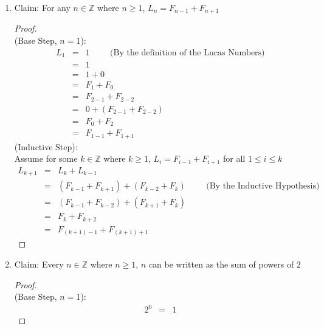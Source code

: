 \documentclass{article}
\begin{document}
\begin{enumerate}
\begin{proof}
\begin{eqnarray}
            &=& 3(a-b) \hspace{1cm} \text{($3(a-b)$ is divisible by $3$ because $3$ and $a-b \in \mathbb{Z}$, so $3(a-b) \in \mathbb{Z}$)}
        \end{eqnarray}
    \end{proof}
    \item Claim: For any $n \in \mathbb{Z}$ where $n \geq 1$, $L_n = F_{n-1} + F_{n+1}$
    \begin{proof}
        \text{} \\
        (Base Step, $n = 1$):
        \begin{eqnarray}
            L_1 &=& 1 \hspace{1cm} \text{(By the definition of the Lucas Numbers)} \\
            &=& 1 \\
            &=& 1 + 0 \\
            &=& F_1 + F_0 \\
            &=& F_{2 - 1} + F_{2-2} \\
            &=& 0 + (F_{2 - 1} + F_{2-2}) \\
            &=& F_0 + F_2 \\
            &=& F_{1-1} + F_{1+1}
        \end{eqnarray}
        (Inductive Step): \\
        Assume for some $k \in \mathbb{Z}$ where $k \geq 1$, $L_i = F_{i - 1} + F_{i + 1}$ for all $1 \leq i \leq k$
        \begin{eqnarray}
            L_{k+1} &=& L_k + L_{k-1} \\
            &=& (F_{k-1} + F_{k+1}) + (F_{k-2} + F_k) \hspace{1cm} \text{(By the Inductive Hypothesis)} \\
            &=& (F_{k-1} + F_{k-2}) + (F_{k+1} + F_k) \\
            &=& F_k + F_{k+2} \\
            &=& F_{(k+1)-1} + F_{(k+1)+1}
        \end{eqnarray}
    \end{proof}
    \item Claim: Every $n \in \mathbb{Z}$ where $n \geq 1$, $n$ can be written as the sum of powers of $2$
    \begin{proof}
        \text{} \\
        (Base Step, $n = 1$):
        \begin{eqnarray}
            2^0 &=& 1
        \end{eqnarray}

\end{proof}
\end{enumerate}
\end{document}
